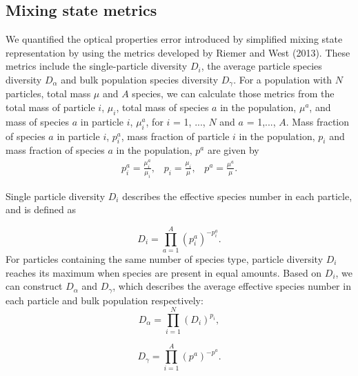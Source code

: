 \documentclass[edeposit,fullpage]{uiucthesis2009}
\begin{document}
\subsection{Mixing state metrics}
We quantified the optical properties error introduced by simplified
mixing state representation by using the metrics developed by Riemer
and West (2013). These metrics include the single-particle diversity
$D_i$, the average particle species diversity $D_\alpha$ and bulk
population species diversity $D_\gamma$. For a population with $N$
particles, total mass $\mu$ and $A$ species, we can calculate those
metrics from the total mass of particle $i$, $\mu_i$, total mass of
species $a$ in the population, $\mu^a$, and mass of species $a$ in
particle $i$, $\mu_i^{a}$, for $i$ = 1, ..., $N$ and $a$ = 1,...,
$A$. Mass fraction of species $a$ in particle $i$, $p_i^a$, mass
fraction of particle $i$ in the population, $p_i$ and mass fraction of
species $a$ in the population, $p^a$ are given by
\begin{equation}
\label{eq:frac}
\begin{split}
    p_i^a = \frac{\mu_i^a}{\mu_i},\;\;\;p_i = \frac{\mu_i}{\mu},\;\;\;p^a = \frac{\mu^a}{\mu}.
\end{split}
\end{equation}

Single particle diversity $D_i$ describes the effective species number
in each particle, and is defined as

\begin{equation}
D_i = \prod_{a=1}^A({p}_i^a)^{-p_i^a}.
\end{equation}
For particles containing the same number of species type, particle
diversity $D_i$ reaches its maximum when species are present in equal
amounts. Based on $D_i$, we can construct $D_\alpha$ and $D_\gamma$,
which describes the average effective species number in each particle
and bulk population respectively:
\begin{equation}
D_\alpha = \prod_{i=1}^N (D_i)^{p_i},
\end{equation}

\begin{equation}
 D_\gamma = \prod_{i=1}^A(p^a)^{-p^a}.  
\end{equation}
\end{document}
